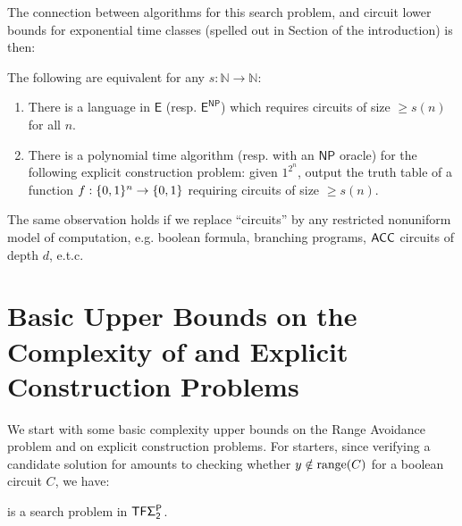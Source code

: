 

The connection between algorithms for this search problem, and circuit lower bounds for exponential time classes (spelled out in Section  of the introduction) is then:
\begin{observation}\label{obs:avoid-algs-are-ckt-lbs}
The following are equivalent for any $s:\mathbb{N} \to \mathbb{N}$:
\begin{enumerate}
	\item  There is a language in $\mathsf{E}$ (resp. $\mathsf{E^{NP}}$) which requires circuits of size $\geq s(n)$ for all $n$.
	\item There is a polynomial time algorithm (resp. with an $\mathsf{NP}$ oracle) for the following explicit construction problem: given $1^{2^n}$, output the truth table of a function $f: \{0,1\}^n \to \{0,1\}$ requiring circuits of size $\geq s(n)$.
\end{enumerate}
\end{observation}
The same observation holds if we replace ``circuits'' by any restricted nonuniform model of computation, e.g. boolean formula, branching programs, $\cl{ACC}$ circuits of depth $d$, e.t.c. 

\section{Basic Upper Bounds on the Complexity of \avoid and Explicit Construction Problems}\label{range:sec:avoid-basic-upper-bounds}
We start with some basic complexity upper bounds on the Range Avoidance problem and on explicit construction problems.
For starters, since verifying a candidate solution for \avoid amounts to checking whether $y \notin \mathrm{range}(C)$ for a boolean circuit $C$, we have:
\begin{observation}
\avoid is a search problem in $\cl{TF\Sigma_2^P}$. 
\end{observation}

